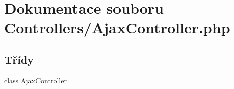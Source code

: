\hypertarget{_ajax_controller_8php}{\section{Dokumentace souboru Controllers/\-Ajax\-Controller.php}
\label{_ajax_controller_8php}
}
\subsection*{Třídy}
\begin{DoxyCompactItemize}
\item 
class \hyperlink{class_ajax_controller}{Ajax\-Controller}
\end{DoxyCompactItemize}
